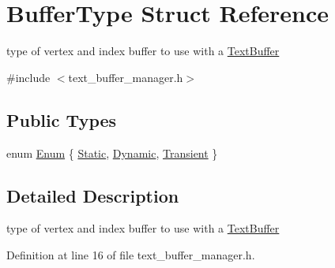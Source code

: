 \hypertarget{struct_buffer_type}{\section{Buffer\+Type Struct Reference}
\label{struct_buffer_type}
}


type of vertex and index buffer to use with a \hyperlink{class_text_buffer}{Text\+Buffer}  




{\ttfamily \#include $<$text\+\_\+buffer\+\_\+manager.\+h$>$}

\subsection*{Public Types}
\begin{DoxyCompactItemize}
\item 
enum \hyperlink{struct_buffer_type_af6eec2447862f2bd9c1f36408176ddda}{Enum} \{ \hyperlink{struct_buffer_type_af6eec2447862f2bd9c1f36408176dddaaff0ca8d763df9fb0a2da604f3b017b5d}{Static}, 
\hyperlink{struct_buffer_type_af6eec2447862f2bd9c1f36408176dddaad50474e8a51b3de3400081a38a970528}{Dynamic}, 
\hyperlink{struct_buffer_type_af6eec2447862f2bd9c1f36408176dddaab874d27e854827e1a311b9cc412f9037}{Transient}
 \}
\end{DoxyCompactItemize}


\subsection{Detailed Description}
type of vertex and index buffer to use with a \hyperlink{class_text_buffer}{Text\+Buffer} 

Definition at line 16 of file text\+\_\+buffer\+\_\+manager.\+h.



